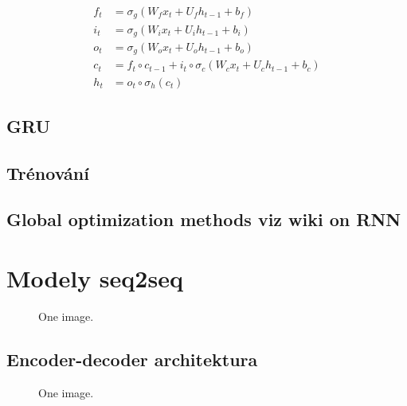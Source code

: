 \begin{align}
    f_{t}&=\sigma _{g}(W_{f}x_{t}+U_{f}h_{t-1}+b_{f})\\
    i_{t}&=\sigma _{g}(W_{i}x_{t}+U_{i}h_{t-1}+b_{i})\\
    o_{t}&=\sigma _{g}(W_{o}x_{t}+U_{o}h_{t-1}+b_{o})\\
    c_{t}&=f_{t}\circ c_{t-1}+i_{t}\circ \sigma_{c}(W_{c}x_{t}+U_{c}h_{t-1}+b_{c})\\
    h_{t}&=o_{t}\circ \sigma _{h}(c_{t})
\end{align}

\subsection{GRU}\label{section:GRU}


\subsection{Trénování}
\subsection{Global optimization methods viz wiki on RNN}




\section{Modely seq2seq}
\begin{figure}
    \begin{center}
    \end{center}
	\caption{One image. }
	\label{img:TODO}
\end{figure}
\subsection{Encoder-decoder architektura}
\begin{figure}
    \begin{center}
    \end{center}
	\caption{One image. }
	\label{img:TODO}
\end{figure}



